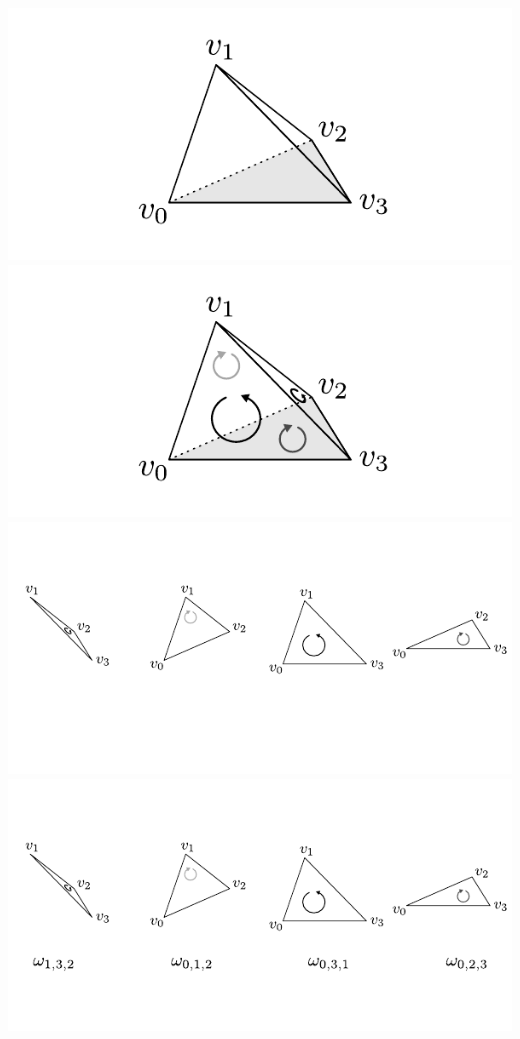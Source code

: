 \documentclass[compress]{beamer}
\begin{document}
\begin{frame}
\begin{center}
\begin{overprint}
      \includegraphics[scale=1.0]{../img/conditions/02.pdf}
      \includegraphics[scale=1.0]{../img/conditions/05.pdf}
      \includegraphics[scale=1.0]{../img/conditions/06.pdf}
      \includegraphics[scale=1.0]{../img/conditions/07.pdf}

\end{overprint}
\end{center}
\end{frame}
\end{document}
